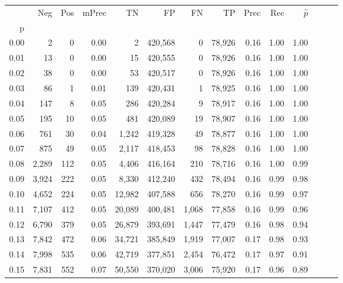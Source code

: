 \begin{tabular}{rrrrrrrrrrrrrr}
\toprule
{} &    Neg &    Pos & mPrec &       TN &       FP &      FN &      TP &  Prec &   Rec & $\hat{p}$ \\
p    &        &        &       &          &          &         &         &       &       &           \\
\midrule
0.00 &      2 &      0 &  0.00 &        2 &  420,568 &       0 &  78,926 &  0.16 &  1.00 &      1.00 \\
0.01 &     13 &      0 &  0.00 &       15 &  420,555 &       0 &  78,926 &  0.16 &  1.00 &      1.00 \\
0.02 &     38 &      0 &  0.00 &       53 &  420,517 &       0 &  78,926 &  0.16 &  1.00 &      1.00 \\
0.03 &     86 &      1 &  0.01 &      139 &  420,431 &       1 &  78,925 &  0.16 &  1.00 &      1.00 \\
0.04 &    147 &      8 &  0.05 &      286 &  420,284 &       9 &  78,917 &  0.16 &  1.00 &      1.00 \\
0.05 &    195 &     10 &  0.05 &      481 &  420,089 &      19 &  78,907 &  0.16 &  1.00 &      1.00 \\
0.06 &    761 &     30 &  0.04 &    1,242 &  419,328 &      49 &  78,877 &  0.16 &  1.00 &      1.00 \\
0.07 &    875 &     49 &  0.05 &    2,117 &  418,453 &      98 &  78,828 &  0.16 &  1.00 &      1.00 \\
0.08 &  2,289 &    112 &  0.05 &    4,406 &  416,164 &     210 &  78,716 &  0.16 &  1.00 &      0.99 \\
0.09 &  3,924 &    222 &  0.05 &    8,330 &  412,240 &     432 &  78,494 &  0.16 &  0.99 &      0.98 \\
0.10 &  4,652 &    224 &  0.05 &   12,982 &  407,588 &     656 &  78,270 &  0.16 &  0.99 &      0.97 \\
0.11 &  7,107 &    412 &  0.05 &   20,089 &  400,481 &   1,068 &  77,858 &  0.16 &  0.99 &      0.96 \\
0.12 &  6,790 &    379 &  0.05 &   26,879 &  393,691 &   1,447 &  77,479 &  0.16 &  0.98 &      0.94 \\
0.13 &  7,842 &    472 &  0.06 &   34,721 &  385,849 &   1,919 &  77,007 &  0.17 &  0.98 &      0.93 \\
0.14 &  7,998 &    535 &  0.06 &   42,719 &  377,851 &   2,454 &  76,472 &  0.17 &  0.97 &      0.91 \\
0.15 &  7,831 &    552 &  0.07 &   50,550 &  370,020 &   3,006 &  75,920 &  0.17 &  0.96 &      0.89 \\

\end{tabular}
